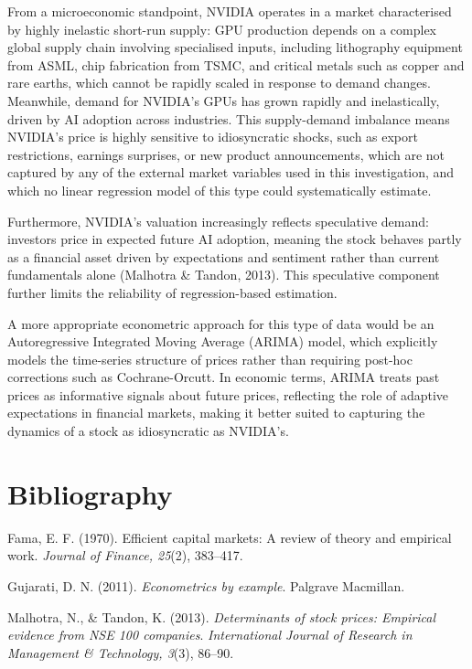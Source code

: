 \documentclass[12pt]{article}
\begin{document}
    From a microeconomic standpoint, NVIDIA operates in a market characterised by highly inelastic short-run supply: GPU production depends on a complex global supply chain involving specialised inputs, including lithography equipment from ASML, chip fabrication from TSMC, and critical metals such as copper and rare earths, which cannot be rapidly scaled in response to demand changes. Meanwhile, demand for NVIDIA's GPUs has grown rapidly and inelastically, driven by AI adoption across industries. This supply-demand imbalance means NVIDIA's price is highly sensitive to idiosyncratic shocks, such as export restrictions, earnings surprises, or new product announcements, which are not captured by any of the external market variables used in this investigation, and which no linear regression model of this type could systematically estimate.
    
    Furthermore, NVIDIA's valuation increasingly reflects speculative demand: investors price in expected future AI adoption, meaning the stock behaves partly as a financial asset driven by expectations and sentiment rather than current fundamentals alone (Malhotra \& Tandon, 2013). This speculative component further limits the reliability of regression-based estimation.
    
    A more appropriate econometric approach for this type of data would be an Autoregressive Integrated Moving Average (ARIMA) model, which explicitly models the time-series structure of prices rather than requiring post-hoc corrections such as Cochrane-Orcutt. In economic terms, ARIMA treats past prices as informative signals about future prices, reflecting the role of adaptive expectations in financial markets, making it better suited to capturing the dynamics of a stock as idiosyncratic as NVIDIA's.

    \newpage

\section{Bibliography}
    
Fama, E. F. (1970). Efficient capital markets: A review of theory and empirical work. \textit{Journal of Finance, 25}(2), 383--417.

Gujarati, D. N. (2011). \textit{Econometrics by example}. Palgrave Macmillan.

Malhotra, N., \& Tandon, K. (2013). \textit{Determinants of stock prices: Empirical evidence from NSE 100 companies}. \textit{International Journal of Research in Management \& Technology, 3}(3), 86--90.
\end{document}
